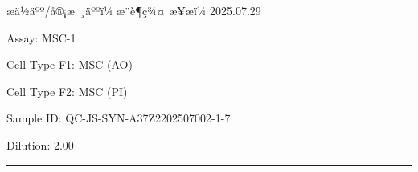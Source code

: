 \documentclass[UTF8,10pt,a4paper,fontset=fandol]{ctexart}
\newcommand{\fieldvalue}[1]{#1}
\newcommand{\handwritten}[1]{#1}
\begin{document}
\begin{center}
\begin{center}
\bigskip
\noindent
\begin{minipage}[t]{0.48\textwidth}
\centering
\fbox{\rule{0pt}{0.25\textwidth}\rule{0.95\linewidth}{0pt}}
\end{minipage}
\hfill
\begin{minipage}[t]{0.48\textwidth}
\centering
\fbox{\rule{0pt}{0.25\textwidth}\rule{0.95\linewidth}{0pt}}
\end{minipage}

\medskip
\noindent
\begin{minipage}[t]{0.48\textwidth}
\centering
\fbox{\rule{0pt}{0.25\textwidth}\rule{0.95\linewidth}{0pt}}
\end{minipage}
\hfill
\begin{minipage}[t]{0.48\textwidth}
\centering
\fbox{\rule{0pt}{0.25\textwidth}\rule{0.95\linewidth}{0pt}}
\end{minipage}

\vfill

\noindent æä½äºº/å®¡æ ¸äººï¼
\fieldvalue{\handwritten{æ¨è¶ç¾¤}}
\hfill
æ¥æï¼
\fieldvalue{\handwritten{2025.07.29}}

\newpage

Assay: 
\fieldvalue{MSC-1}

\vspace{0.5em}

Cell Type F1: 
\fieldvalue{MSC (AO)}

Cell Type F2: 
\fieldvalue{MSC (PI)}

\vspace{0.5em}

Sample ID: 
\fieldvalue{QC-JS-SYN-A37Z2202507002-1-7}

Dilution: 
\fieldvalue{2.00}

\vspace{0.5em}
\hrule
\vspace{0.3em}


\end{center}
\end{center}
\end{document}
